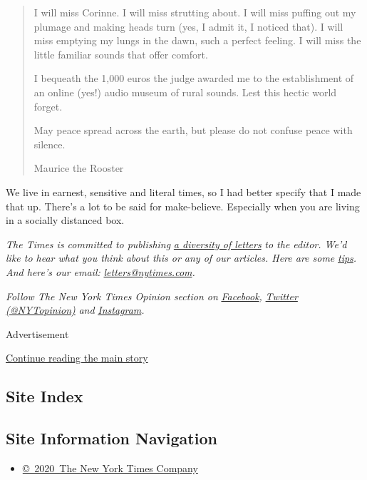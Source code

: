 \begin{quote}
I will miss Corinne. I will miss strutting about. I will miss puffing
out my plumage and making heads turn (yes, I admit it, I noticed that).
I will miss emptying my lungs in the dawn, such a perfect feeling. I
will miss the little familiar sounds that offer comfort.

I bequeath the 1,000 euros the judge awarded me to the establishment of
an online (yes!) audio museum of rural sounds. Lest this hectic world
forget.

May peace spread across the earth, but please do not confuse peace with
silence.

Maurice the Rooster
\end{quote}

We live in earnest, sensitive and literal times, so I had better specify
that I made that up. There's a lot to be said for make-believe.
Especially when you are living in a socially distanced box.

\emph{The Times is committed to publishing}
\href{https://www.nytimes.com/2019/01/31/opinion/letters/letters-to-editor-new-york-times-women.html}{\emph{a
diversity of letters}} \emph{to the editor. We'd like to hear what you
think about this or any of our articles. Here are some}
\href{https://help.nytimes.com/hc/en-us/articles/115014925288-How-to-submit-a-letter-to-the-editor}{\emph{tips}}\emph{.
And here's our email:}
\href{mailto:letters@nytimes.com}{\emph{letters@nytimes.com}}\emph{.}

\emph{Follow The New York Times Opinion section on}
\href{https://www.facebook.com/nytopinion}{\emph{Facebook}}\emph{,}
\href{http://twitter.com/NYTOpinion}{\emph{Twitter (@NYTopinion)}}
\emph{and}
\href{https://www.instagram.com/nytopinion/}{\emph{Instagram}}\emph{.}

Advertisement

\protect\hyperlink{after-bottom}{Continue reading the main story}

\hypertarget{site-index}{%
\subsection{Site Index}\label{site-index}}

\hypertarget{site-information-navigation}{%
\subsection{Site Information
Navigation}\label{site-information-navigation}}

\begin{itemize}
\tightlist
\item
  \href{https://help.nytimes.com/hc/en-us/articles/115014792127-Copyright-notice}{©~2020~The
  New York Times Company}
\end{itemize}

